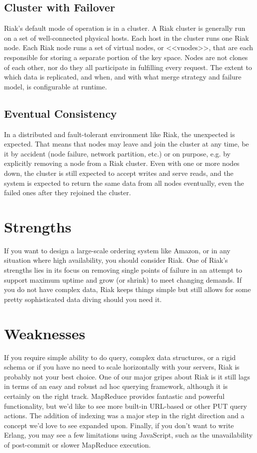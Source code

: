 \subsection{Cluster with Failover}

Riak's default mode of operation is in a cluster. A Riak cluster is generally run on a set of well-connected physical hosts. Each host in the cluster runs one Riak node. Each Riak node runs a set of virtual nodes, or <<vnodes>>, that are each responsible for storing a separate portion of the key space. Nodes are not clones of each other, nor do they all participate in fulfilling every request. The extent to which data is replicated, and when, and with what merge strategy and failure model, is configurable at runtime.

\subsection{Eventual Consistency}

In a distributed and fault-tolerant environment like Riak, the unexpected is expected. That means that nodes may leave and join the cluster at any time, be it by accident (node failure, network partition, etc.) or on purpose, e.g. by explicitly removing a node from a Riak cluster. Even with one or more nodes down, the cluster is still expected to accept writes and serve reads, and the system is expected to return the same data from all nodes eventually, even the failed ones after they rejoined the cluster.

\section{Strengths}

If you want to design a large-scale ordering system like Amazon, or in any situation where high availability, you should consider Riak. One of Riak's strengths lies in its focus on removing single points of failure in an attempt to support maximum uptime and grow (or shrink) to meet changing demands. If you do not have complex data, Riak keeps things simple but still allows for some pretty sophisticated data diving should you need it.\cite{seven_databases}

\section{Weaknesses}

If you require simple ability to do query, complex data structures, or a rigid schema or if you have no need to scale horizontally with your servers, Riak is probably not your best choice. One of our major gripes about Riak is it still lags in terms of an easy and robust ad hoc querying framework, although it is certainly on the right track. MapReduce provides fantastic and powerful functionality, but we’d like to see more built-in URL-based or other PUT query actions. The addition of indexing was a major step in the right direction and a concept we’d love to see expanded upon. Finally, if you don’t want to write Erlang, you may see a few limitations using JavaScript, such as the unavailability of post-commit or slower MapReduce execution.\cite{seven_databases}

